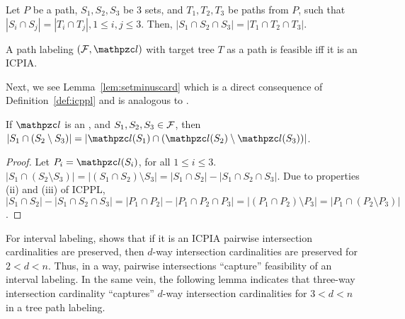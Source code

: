\begin{lemma}
  \label{lem:intersection-cardinality} 
  Let $P$ be a path, $S_1, S_2, S_3$ be 3 sets, and $T_1, T_2, T_3$ be
  paths from $P$, such that $|S_i \cap S_j |=|T_i \cap T_j|, 1 \leq
  i,j \leq 3$.  Then, $|S_1 \cap S_2 \cap S_3| = |T_1 \cap T_2 \cap
  T_3|$.
\end{lemma}
\begin{lemma}
  \label{lem:icpia} 
  A path labeling $(\cF, \cl)$ with target tree $T$ as a path is
  feasible iff it is an ICPIA.
\end{lemma}

Next, we see Lemma~\ref{lem:setminuscard} which is a direct
consequence of Definition~\ref{def:icppl} and is analogous to
\cite[Cor.~1]{nsnrs09}.

\begin{lemma}
  \label{lem:setminuscard}
  If $\cl$ is an \ICPPL, and $S_1, S_2, S_3 \in {\cal F}$, then $|S_1 \cap
  (S_2 \setminus S_3)| = |\cl(S_1) \cap (\cl(S_2) \setminus
  \cl(S_3))|$.
\end{lemma}
\begin{proof}\thesisspacing%
  Let $P_i = \cl(S_i)$, for all $1 \le i \le 3$.  $|S_1 \cap (S_2
  \setminus S_3)| = |(S_1 \cap S_2) \setminus S_3| = |S_1 \cap S_2| -
  |S_1 \cap S_2 \cap S_3|$. Due to properties (ii) and (iii) of ICPPL,
  $|S_1 \cap S_2| - |S_1 \cap S_2 \cap S_3| = |P_1 \cap P_2| - |P_1
  \cap P_2 \cap P_3| = |(P_1 \cap P_2) \setminus P_3| = |P_1 \cap (P_2
  \setminus P_3)|$. %
\end{proof}

For interval labeling, \cite{nsnrs09} shows that if it is an ICPIA \ie
pairwise intersection cardinalities are preserved, then $d$-way
intersection cardinalities are preserved for $2 < d < n$. Thus, in a
way, pairwise intersections ``capture'' feasibility of an interval
labeling. In the same vein, the following lemma indicates that
three-way intersection cardinality ``captures'' $d$-way intersection
cardinalities for $3 < d < n$ in a tree path labeling.

